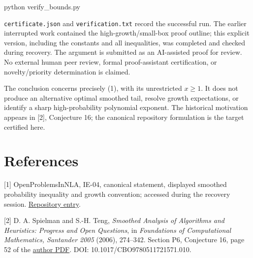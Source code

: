 \documentclass[
  11pt,
  letterpaper,
]{article}
\newenvironment{Shaded}{}{}
\newcommand{\NormalTok}[1]{#1}
\begin{document}
\begin{Shaded}
\begin{Highlighting}[]
\NormalTok{python verify\_bounds.py}
\end{Highlighting}
\end{Shaded}

\texttt{certificate.json} and \texttt{verification.txt} record the
successful run. The earlier interrupted work contained the
high-growth/small-box proof outline; this explicit version, including
the constants and all inequalities, was completed and checked during
recovery. The argument is submitted as an AI-assisted proof for review.
No external human peer review, formal proof-assistant certification, or
novelty/priority determination is claimed.

The conclusion concerns precisely (1), with its unrestricted \(x\geq1\).
It does not produce an alternative optimal smoothed tail, resolve growth
expectations, or identify a sharp high-probability polynomial exponent.
The historical motivation appears in {[}2{]}, Conjecture 16; the
canonical repository formulation is the target certified here.

\section{References}\label{references}

{[}1{]} OpenProblemsInNLA, IE-04, canonical statement, displayed
smoothed probability inequality and growth convention; accessed during
the recovery session.
\href{https://github.com/ajt60gaibb/OpenProblemsInNLA/tree/main/linear-systems-and-elimination/IE-04}{Repository
entry}.

{[}2{]} D. A. Spielman and S.-H. Teng, \emph{Smoothed Analysis of
Algorithms and Heuristics: Progress and Open Questions}, in
\emph{Foundations of Computational Mathematics, Santander 2005} (2006),
274--342. Section P6, Conjecture 16, page 52 of the
\href{https://www.cs.yale.edu/homes/spielman/PAPERS/focmSmoothed.pdf}{author
PDF}. DOI: 10.1017/CBO9780511721571.010.
\end{document}

